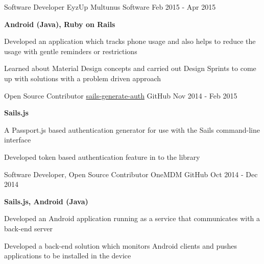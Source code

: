 \begin{cventries}
{\begin{cvitems}
      \end{cvitems}
    }
  \cventry
    {Software Developer}
    {EyzUp}
    {Multunus Software}
    {Feb 2015 - Apr 2015}
    {
      \begin{cvitems}
        \item {\textbf{Android (Java), Ruby on Rails}}
        \item {Developed an application which tracks phone usage and also helps to reduce the usage with gentle reminders or restrictions}
        \item {Learned about Material Design concepts and carried out Design Sprints to come up with solutions with a problem driven approach}
      \end{cvitems}
    }
  \cventry
    {Open Source Contributor}
    {\href{https://github.com/kasperisager/sails-generate-auth}{sails-generate-auth}}
    {GitHub}
    {Nov 2014 - Feb 2015}
    {
      \begin{cvitems}
        \item {\textbf{Sails.js}}
        \item {A Passport.js based authentication generator for use with the Sails command-line interface}
        \item {Developed token based authentication feature in to the library}
      \end{cvitems}
    }
  \cventry
    {Software Developer, Open Source Contributor}
    {OneMDM}
    {GitHub}
    {Oct 2014 - Dec 2014}
    {
      \begin{cvitems}
        \item {\textbf{Sails.js, Android (Java)}}
        \item {Developed an Android application running as a service that communicates with a back-end server}
        \item {Developed a back-end solution which monitors Android clients and pushes applications to be installed in the device}

\end{cvitems}}
\end{cventries}
